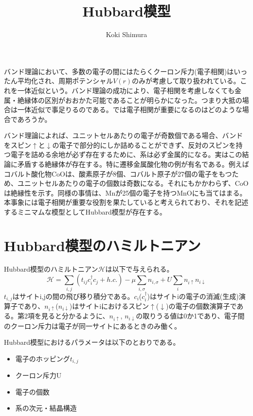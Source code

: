 \documentclass{jarticle}
\begin{document}
\title{Hubbard模型}
\author{Koki Shimura}
\maketitle

バンド理論において、多数の電子の間にはたらくクーロン斥力(電子相関)はいったん平均化され、周期ポテンシャル$V(r)$のみが考慮して取り扱われている。これを一体近似という。バンド理論の成功により、電子相関を考慮しなくても金属・絶縁体の区別がおおかた可能であることが明らかになった。つまり大抵の場合は一体近似で事足りるのである。では電子相関が重要になるのはどのような場合であろうか。

バンド理論によれば、ユニットセルあたりの電子が奇数個である場合、バンドをスピン$\uparrow$と$\downarrow$の電子で部分的にしか詰めることができず、反対のスピンを持つ電子を詰める余地が必ず存在するために、系は必ず金属的になる。実はこの結論に矛盾する絶縁体が存在する。特に遷移金属酸化物の例が有名である。例えばコバルト酸化物CoOは、酸素原子が8個、コバルト原子が27個の電子をもつため、ユニットセルあたりの電子の個数は奇数になる。それにもかかわらず、CoOは絶縁性を示す。同様の事情は、Mnが25個の電子を持つMnOにも当てはまる。本事象には電子相関が重要な役割を果たしていると考えられており、それを記述するミニマムな模型としてHubbard模型が存在する。

\section{Hubbard模型のハミルトニアン}
Hubbard模型のハミルトニアン$\mathcal{H}$は以下で与えられる。
\begin{equation}
  \mathcal{H} = \sum_{i,j} (t_{ij} c_{i}^\dagger c_{j} + h.c.) -\mu \sum_{i,\sigma}n_{i,\sigma}+ U\sum_{i}n_{i\uparrow}n_{i\downarrow}
  \label{Hubbard}
\end{equation}
$t_{i,j}$はサイトi,jの間の飛び移り積分である。$c_{i}$($c_{i}^{\dagger}$)はサイトiの電子の消滅(生成)演算子であり、$n_{i\uparrow}$($n_{i\downarrow}$)はサイトiにおけるスピン$\uparrow$($\downarrow$)の電子の個数演算子である。第2項を見ると分かるように、$n_{i\uparrow}$, $n_{i\downarrow}$の取りうる値は0か1であり、電子間のクーロン斥力は電子が同一サイトにあるときのみ働く。

Hubbard模型におけるパラメータは以下のとおりである。
\begin{itemize}
  \item 電子のホッピング$t_{i,j}$
  \item クーロン斥力U
  \item 電子の個数
  \item 系の次元・結晶構造
\end{itemize}
\end{document}
